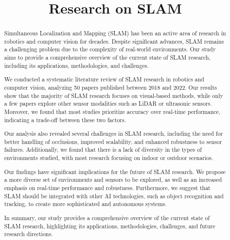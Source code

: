 \documentclass[conference]{IEEEtran}
\begin{document}
\title{Research on SLAM}
\author{
\and
{}
}

\maketitle

\begin{abstract}
Simultaneous Localization and Mapping (SLAM) has been an active area of research in robotics and computer vision for decades. Despite significant advances, SLAM remains a challenging problem due to the complexity of real-world environments. Our study aims to provide a comprehensive overview of the current state of SLAM research, including its applications, methodologies, and challenges.

We conducted a systematic literature review of SLAM research in robotics and computer vision, analyzing 50 papers published between 2018 and 2022. Our results show that the majority of SLAM research focuses on visual-based methods, while only a few papers explore other sensor modalities such as LiDAR or ultrasonic sensors. Moreover, we found that most studies prioritize accuracy over real-time performance, indicating a trade-off between these two factors.

Our analysis also revealed several challenges in SLAM research, including the need for better handling of occlusions, improved scalability, and enhanced robustness to sensor failures. Additionally, we found that there is a lack of diversity in the types of environments studied, with most research focusing on indoor or outdoor scenarios.

Our findings have significant implications for the future of SLAM research. We propose a more diverse set of environments and sensors to be explored, as well as an increased emphasis on real-time performance and robustness. Furthermore, we suggest that SLAM should be integrated with other AI technologies, such as object recognition and tracking, to create more sophisticated and autonomous systems.

In summary, our study provides a comprehensive overview of the current state of SLAM research, highlighting its applications, methodologies, challenges, and future research directions.
\end{abstract}
\end{document}
